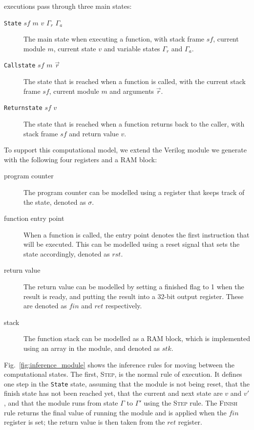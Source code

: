 \compcert{} executions pass through three main states:
\begin{description}
  \item[\texttt{State} $\mathit{sf}$ $m$ $v$ $\Gamma_{r}$ $\Gamma_{a}$] The main state when executing a function, with stack frame $\mathit{sf}$, current module $m$, current state $v$ and variable states $\Gamma_{r}$ and $\Gamma_{a}$.
  \item[\texttt{Callstate} $\mathit{sf}$ $m$ $\vec{r}$] The state that is reached when a function is called, with the current stack frame $\mathit{sf}$, current module $m$ and arguments $\vec{r}$.
  \item[\texttt{Returnstate} $\mathit{sf}$ $v$] The state that is reached when a function returns back to the caller, with stack frame $\mathit{sf}$ and return value $v$.
\end{description}

To support this computational model, we extend the Verilog module we generate with the following four registers and a RAM block:

\begin{description}
  \item[program counter] The program counter can be modelled using a register that keeps track of the state, denoted as $\sigma$.
  \item[function entry point] When a function is called, the entry point denotes the first instruction that will be executed. This can be modelled using a reset signal that sets the state accordingly, denoted as $\mathit{rst}$.
  \item[return value] The return value can be modelled by setting a finished flag to 1 when the result is ready, and putting the result into a 32-bit output register. These are denoted as $\mathit{fin}$ and $\mathit{ret}$ respectively.
  \item[stack] The function stack can be modelled as a RAM block, which is implemented using an array in the module, and denoted as $\mathit{stk}$.
\end{description}

Fig.~\ref{fig:inference_module} shows the inference rules for moving between the computational states.  The first, \textsc{Step}, is the normal rule of execution.  It defines one step in the \texttt{State} state, assuming that the module is not being reset, that the finish state has not been reached yet, that the current and next state are $v$ and $v'$, and that the module runs from state $\Gamma$ to $\Gamma'$ using the \textsc{Step} rule.  The \textsc{Finish} rule returns the final value of running the module and is applied when the $\mathit{fin}$ register is set; the return value is then taken from the $\mathit{ret}$ register.


